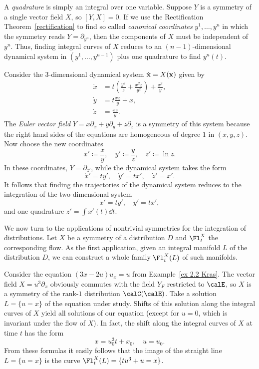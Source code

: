 A \emph{quadrature} is simply an integral over one variable. Suppose $Y$ is a symmetry of a single vector field $X$, so $[Y,X]=0$. If we use the Rectification Theorem~\ref{rectification} to find so called \emph{canonical coordinates}  $y^1,\ldots,y^n$ in which the symmetry reads $Y=\partial_{y^n}$, then the components of $X$ must be independent of $y^n$. Thus, finding integral curves of $X$ reduces to an $(n-1)$-dimensional dynamical system in $(y^1,\ldots,y^{n-1})$ plus one quadrature to find $y^n(t)$.


\begin{example}
    Consider the $3$-dimensional dynamical system $\dot{\bf{x}}=X(\bf{x})$ given by
    \begin{align}
        \dot x&=t\left(\frac{y^2}{z}+\frac{x^2z}{y^2}\right)+\frac{x^2}{y},\\
        \dot y&=t\frac{xz}{y}+x,\\
        \dot z&=\frac{xz}{y}.
    \end{align}
    The \emph{Euler vector field} $Y=x\partial_x+y\partial_y+z\partial_z$ is a symmetry of this system because the right hand sides of the equations are homogeneous of degree $1$ in $(x,y,z)$. Now choose the new coordinates 
    \[x'\coloneqq \frac{x}{y},\quad y'\coloneqq \frac{y}{z},\quad z'\coloneqq \ln z.\]
    In these coordinates, $Y=\partial_{z'}$, while the dynamical system takes the form 
    \[\dot x'=ty',\quad \dot y'=tx',\quad \dot z'=x'.\]
    It follows that finding the trajectories of the dynamical system reduces to the integration of the two-dimensional system 
    \[\dot x'=t y',\quad \dot y'=tx',\]
    and one quadrature $z'=\int x'(t)\dd t$.
\end{example}

We now turn to the applications of nontrivial symmetries for the integration of distributions. Let $X$ be a symmetry of a distribution $D$ and $\Fl^X_t$ the corresponding flow. As the first application, given an integral manifold $L$ of the distribution $D$, we can construct a whole family $\Fl_t^X(L)$ of such manifolds.

\begin{example}\label{ex 4.4 Kras}
    Consider the equation $(3x-2u)u_x=u$ from Example~\ref{ex 2.2 Kras}. The vector field $X=u^3\partial_x$ obviously commutes with the field $Y_F$ restricted to $\calE$, so $X$ is a symmetry of the rank-$1$ distribution $\calC(\calE)$. Take a solution $L=\{u=x\}$ of the equation under study. Shifts of this solution along the integral curves of $X$ yield all solutions of our equation (except for $u=0$, which is invariant under the flow of $X$). In fact, the shift along the integral curves of $X$ at time $t$ has the form 
    \[x=u_0^3t+x_0,\quad u=u_0.\]
    From these formulas it easily follows that the image of the straight line $L=\{u=x\}$ is the curve $\Fl^X_t(L)=\{tu^3+u=x\}$.
\end{example}

